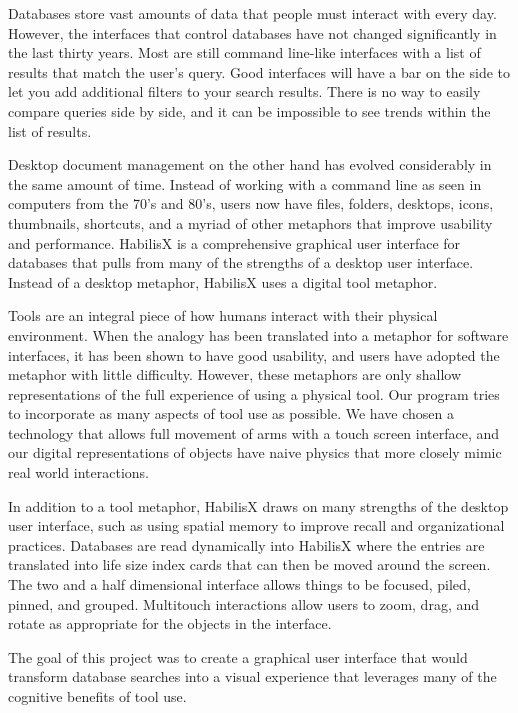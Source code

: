 \documentclass{article}
\begin{document}
Databases store vast amounts of data that people must interact with every day.  However, the interfaces that control databases have not changed significantly in the last thirty years.  Most are still command line-like  interfaces with a list of results that match the user's query.  Good interfaces will have a bar on the side to let you add additional filters to your search results.  There is no way to easily compare queries side by side, and it can be impossible to see trends within the list of results.

Desktop document management on the other hand has evolved considerably in the same amount of time.  Instead of working with a command line as seen in computers from the 70's and 80's, users now have files, folders, desktops, icons, thumbnails, shortcuts, and a myriad of other metaphors that improve usability and performance.   HabilisX is a comprehensive graphical user interface for databases that pulls from many of the strengths of a desktop user interface. Instead of a desktop metaphor, HabilisX uses a digital tool metaphor.

Tools are an integral piece of how humans interact with their physical environment.  When the analogy has been translated into a metaphor for software interfaces, it has been shown to have good usability, and users have adopted the metaphor with little difficulty.  However, these metaphors are only shallow representations of the full experience of using a physical tool.  Our program tries to incorporate as many aspects of tool use as possible.  We have chosen a technology that allows full movement of arms with a touch screen interface, and our digital representations of objects have naive physics that more closely mimic real world interactions.

In addition to a tool metaphor, HabilisX draws on many strengths of the desktop user interface, such as using spatial memory to improve recall and organizational practices.  Databases are read dynamically into HabilisX where the entries are translated into life size index cards that can then be moved around the screen.  The two and a half dimensional interface allows things to be focused, piled, pinned, and grouped.  Multitouch interactions allow users to zoom, drag, and rotate as appropriate for the objects in the interface. 


The goal of this project was to create a graphical user interface that would transform database searches into a visual experience that leverages many of the cognitive benefits of tool use.
\end{document}

